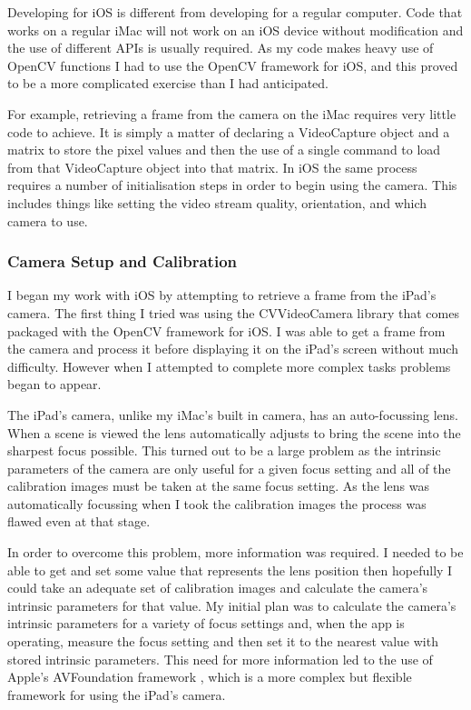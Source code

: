\documentclass{article}
\begin{document}
Developing for iOS is different from developing for a regular computer. Code that works on a regular iMac will not work on an iOS device without modification and the use of different APIs is usually required. As my code makes heavy use of OpenCV functions I had to use the OpenCV framework for iOS, and this proved to be a more complicated exercise than I had anticipated. \par

For example, retrieving a frame from the camera on the iMac requires very little code to achieve. It is simply a matter of declaring a VideoCapture object and a matrix to store the pixel values and then the use of a single command to load from that VideoCapture object into that matrix. In iOS the same process requires a number of initialisation steps in order to begin using the camera. This includes things like setting the video stream quality, orientation, and which camera to use. \par

\subsubsection{Camera Setup and Calibration}

I began my work with iOS by attempting to retrieve a frame from the iPad's camera. The first thing I tried was using the CVVideoCamera library that comes packaged with the OpenCV framework for iOS. I was able to get a frame from the camera and process it before displaying it on the iPad's screen without much difficulty. However when I attempted to complete more complex tasks problems began to appear. \par

The iPad's camera, unlike my iMac's built in camera, has an auto-focussing lens. When a scene is viewed the lens automatically adjusts to bring the scene into the sharpest focus possible. This turned out to be a large problem as the intrinsic parameters of the camera are only useful for a given focus setting and all of the calibration images must be taken at the same focus setting. As the lens was automatically focussing when I took the calibration images the process was flawed even at that stage. \par

In order to overcome this problem, more information was required. I needed to be able to get and set some value that represents the lens position \cite{xamarin} then hopefully I could take an adequate set of calibration images and calculate the camera's intrinsic parameters for that value. My initial plan was to calculate the camera's intrinsic parameters for a variety of focus settings and, when the app is operating, measure the focus setting and then set it to the nearest value with stored intrinsic parameters. This need for more information led to the use of Apple's AVFoundation framework \cite{apple_class}, which is a more complex but flexible framework for using the iPad's camera. 
\end{document}

